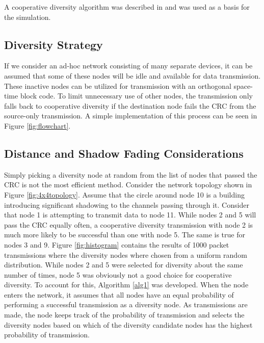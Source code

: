 A cooperative diversity algorithm was described in \cite{4686273} and was used as a basis for the simulation.

\subsection{Diversity Strategy}
If we consider an ad-hoc network consisting of many separate devices, it can be assumed that some of these nodes will be idle and available for data transmission.
These inactive nodes can be utilized for transmission with an orthogonal space-time block code.
To limit unnecessary use of other nodes, the transmission only falls back to cooperative diversity if the destination node fails the CRC from the source-only transmission. A simple implementation of this process can be seen in Figure  \ref{fig:flowchart}.



\subsection{Distance and Shadow Fading Considerations}
Simply picking a diversity node at random from the list of nodes that passed the CRC is not the most efficient method.
Consider the network topology shown in Figure \ref{fig:4x4topology}.
Assume that the circle around node 10 is a building introducing significant shadowing to the channels passing through it.
Consider that node 1 is attempting to transmit data to node 11.
While nodes 2 and 5 will pass the CRC equally often,  a cooperative diversity transmission with node 2 is much more likely to be successful than one with node 5.
The same is true for nodes 3 and 9.
Figure \ref{fig:histogram} contains the results of 1000 packet transmissions where the diversity nodes where chosen from a uniform random distribution.
While nodes 2 and 5 were selected for diversity about the same number of times, node 5 was obviously not a good choice for cooperative diversity.
To account for this, Algorithm \ref{alg1} was developed.
When the node enters the network, it assumes that all nodes have an equal probability of performing a successful transmission as a diversity node.
As transmissions are made, the node keeps track of the probability of transmission and selects the diversity nodes based on which of the diversity candidate nodes has the highest probability of transmission.





